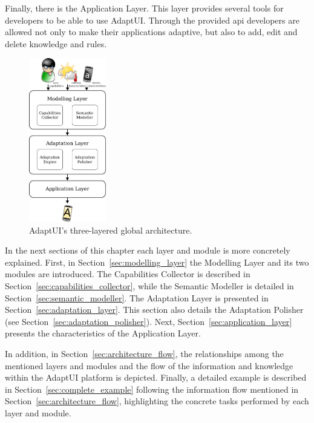 Finally, there is the Application Layer. This layer provides several tools for
developers to be able to use AdaptUI. Through the provided \ac{api} developers 
are allowed not only to make their applications adaptive, but also to add, edit 
and delete knowledge and rules.

\begin{figure}[H]
\centering
\includegraphics[width=0.30\textwidth]{architecture.pdf}
\caption{AdaptUI's three-layered global architecture.}
\label{fig:architecture}
\end{figure}

In the next sections of this chapter each layer and module is more concretely
explained. First, in Section~\ref{sec:modelling_layer} the Modelling Layer and
its two modules are introduced. The Capabilities Collector is described in
Section~\ref{sec:capabilities_collector}, while the Semantic Modeller is 
detailed in Section~\ref{sec:semantic_modeller}. The Adaptation Layer is 
presented in Section~\ref{sec:adaptation_layer}. This section also details the 
Adaptation Polisher (see Section~\ref{sec:adaptation_polisher}). Next,
Section~\ref{sec:application_layer} presents the characteristics of the 
Application Layer.

In addition, in Section~\ref{sec:architecture_flow}, the relationships among 
the mentioned layers and modules and the flow of the information and knowledge 
within the AdaptUI platform is depicted. Finally, a detailed example is
described in Section~\ref{sec:complete_example} following the information flow
mentioned in Section~\ref{sec:architecture_flow}, highlighting the concrete
tasks performed by each layer and module.






